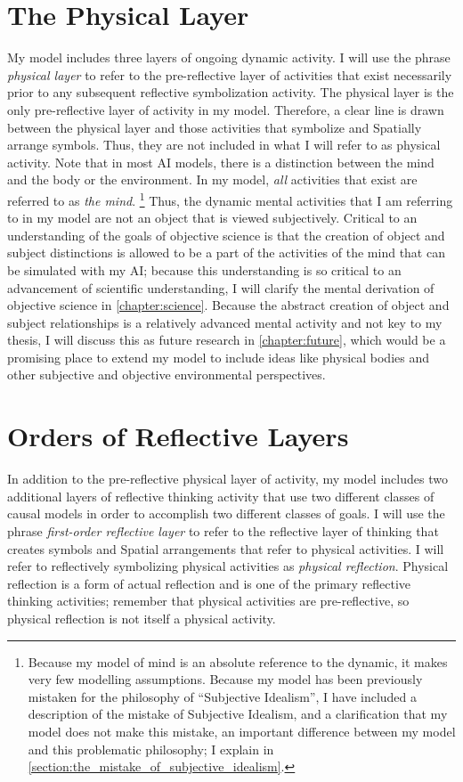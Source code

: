 \section{The Physical Layer}

My model includes three layers of ongoing dynamic activity.  I will
use the phrase \emph{physical layer} to refer to the pre-reflective
layer of activities that exist necessarily prior to any subsequent
reflective symbolization activity.  The physical layer is the only
pre-reflective layer of activity in my model.  Therefore, a clear line
is drawn between the physical layer and those activities that
symbolize and Spatially arrange symbols.  Thus, they are not included
in what I will refer to as physical activity.  Note that in most AI
models, there is a distinction between the mind and the body or the
environment.  In my model, \emph{all} activities that exist are
referred to as \emph{the mind}.
\footnote{Because my model of mind is an absolute reference to the
  dynamic, it makes very few modelling assumptions.  Because my model
  has been previously mistaken for the philosophy of ``Subjective
  Idealism'', I have included a description of the mistake of
  Subjective Idealism, and a clarification that my model does not make
  this mistake, an important difference between my model and this
  problematic philosophy; I explain in
  \autoref{section:the_mistake_of_subjective_idealism}.}  Thus, the
dynamic mental activities that I am referring to in my model are not
an object that is viewed subjectively.  Critical to an understanding
of the goals of objective science is that the creation of object and
subject distinctions is allowed to be a part of the activities of the
mind that can be simulated with my AI; because this understanding is
so critical to an advancement of scientific understanding, I will
clarify the mental derivation of objective science in
\autoref{chapter:science}.  Because the abstract creation of object
and subject relationships is a relatively advanced mental activity and
not key to my thesis, I will discuss this as future research in
\autoref{chapter:future}, which would be a promising place to extend
my model to include ideas like physical bodies and other subjective
and objective environmental perspectives.

\section{Orders of Reflective Layers}

In addition to the pre-reflective physical layer of activity, my model
includes two additional layers of reflective thinking activity that
use two different classes of causal models in order to accomplish two
different classes of goals.  I will use the phrase \emph{first-order
  reflective layer} to refer to the reflective layer of thinking that
creates symbols and Spatial arrangements that refer to physical
activities.  I will refer to reflectively symbolizing physical
activities as \emph{physical reflection}.  Physical reflection is a
form of actual reflection and is one of the primary reflective
thinking activities; remember that physical activities are
pre-reflective, so physical reflection is not itself a physical
activity.

